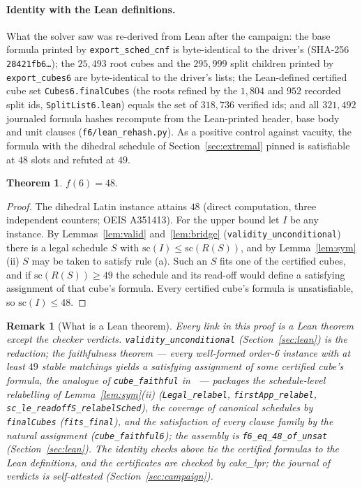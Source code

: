 \documentclass[11pt]{article}
\newtheorem{theorem}{Theorem}
\newtheorem{remark}{Remark}
\begin{document}
\paragraph{Identity with the Lean definitions.} What the solver saw was re-derived from Lean after
the campaign: the base formula printed by \texttt{export\_sched\_cnf} is byte-identical to the
driver's (SHA-256 \texttt{28421fb6\ldots}); the $25{,}493$ root cubes and the $295{,}999$ split
children printed by \texttt{export\_cubes6} are byte-identical to the driver's lists; the
Lean-defined certified cube set \texttt{Cubes6.finalCubes} (the roots refined by the $1{,}804$ and
$952$ recorded split ids, \texttt{SplitList6.lean}) equals the set of $318{,}736$ verified ids; and
all $321{,}492$ journaled formula hashes recompute from the Lean-printed header, base body and unit
clauses (\texttt{f6/lean\_rehash.py}). As a positive control against vacuity, the formula with the
dihedral schedule of Section~\ref{sec:extremal} pinned is satisfiable at $48$ slots and refuted at
$49$.

\begin{theorem}\label{thm:f6}
$f(6)=48$.
\end{theorem}

\begin{proof}
The dihedral Latin instance attains $48$ (direct computation, three independent counters; OEIS
A351413). For the upper bound let $I$ be any instance. By Lemmas~\ref{lem:valid}
and~\ref{lem:bridge} (\texttt{validity\_unconditional}) there is a legal schedule $S$ with
$\mathrm{sc}(I)\le\mathrm{sc}(R(S))$, and by Lemma~\ref{lem:sym}(ii) $S$ may be taken to satisfy
rule (a). Such an $S$ fits one of the certified cubes, and if $\mathrm{sc}(R(S))\ge 49$ the
schedule and its read-off would define a satisfying assignment of that cube's formula. Every
certified cube's formula is unsatisfiable, so $\mathrm{sc}(I)\le 48$.
\end{proof}

\begin{remark}[What is a Lean theorem]\label{rem:status}
Every link in this proof is a Lean theorem except the checker verdicts.
\texttt{validity\_unconditional} (Section~\ref{sec:lean}) is the reduction; the faithfulness
theorem --- every well-formed order-6 instance with at least $49$ stable matchings yields a
satisfying assignment of some certified cube's formula, the analogue of \texttt{cube\_faithful}
in~\cite{f5paper} --- packages the schedule-level relabelling of Lemma~\ref{lem:sym}(ii)
(\texttt{Legal\_relabel}, \texttt{firstApp\_relabel}, \texttt{sc\_le\_readoffS\_relabelSched}),
the coverage of canonical schedules by \texttt{finalCubes} (\texttt{fits\_final}), and the
satisfaction of every clause family by the natural assignment (\texttt{cube\_faithful6}); the
assembly is \texttt{f6\_eq\_48\_of\_unsat} (Section~\ref{sec:lean}). The identity checks above
tie the certified formulas to the Lean definitions, and the certificates are checked by
cake\_lpr; the journal of verdicts is self-attested (Section~\ref{sec:campaign}).
\end{remark}
\end{document}
